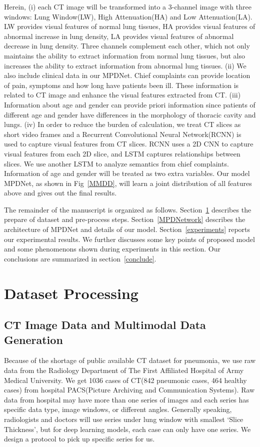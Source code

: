 \documentclass[journal]{IEEEtran}
\begin{document}
Herein, (i) each CT image will be transformed into a 3-channel image with three windows: Lung Window(LW), High Attenuation(HA) and Low Attenuation(LA). LW provides visual features of normal lung tissues, HA provides visual features of abnormal increase in lung density, LA provides visual features of abnormal decrease in lung density. Three channels complement each other, which not only maintains the ability to extract information from normal lung tissues, but also increases the ability to extract information from abnormal lung tissues.
(ii) We also include clinical data in our MPDNet. Chief complaints can provide location of pain, symptoms and how long have patients been ill. These information is related to CT image and enhance the visual features extracted from CT. (iii) Information about age and gender can provide priori information since patients of different age and gender have differences in the morphology of thoracic cavity and lungs. (iv) In order to reduce the burden of calculation, we treat CT slices as short video frames and a Recurrent Convolutional Neural Network(RCNN) is used to capture visual features from CT slices. RCNN uses a 2D CNN to capture visual features from each 2D slice, and LSTM captures relationships between slices. We use another LSTM to analyze semantics from chief complaints. Information of age and gender will be treated as two extra variables. Our model MPDNet, as shown in Fig~\ref{MMDD}, will learn a joint distribution of all features above and gives out the final results.

The remainder of the manuscript is organized as follows. 
Section~\ref{datasetprocessing} describes the prepare of dataset and pre-process steps.
Section~\ref{MPDNetwork} describes the architecture of MPDNet and details of our model.
Section~\ref{experiments} reports our experimental results. We further discusses some key points of proposed model and some phenomenons shown during experiments in this section.
Our conclusions are summarized in section~\ref{conclude}.


\section{Dataset Processing}
\label{datasetprocessing}
\subsection{CT Image Data and Multimodal Data Generation}
\label{ctimagedata}
Because of the shortage of public available CT dataset for pneumonia, we use raw data from the Radiology Department of The First Affiliated Hospital of Army Medical University. We get 1036 cases of CT(842 pneumonic cases, 464 healthy cases) from hospital PACS(Picture Archiving and Communication Systems). Raw data from hospital may have more than one series of images and each series has specific data type, image windows, or different angles. 
Generally speaking, radiologists and doctors will use series under lung window with smallest `Slice Thickness', but for deep learning models, each case can only have one series. We design a protocol to pick up specific series for us.
\end{document}
